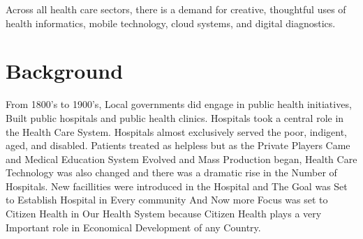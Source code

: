 \documentclass[12pt]{article}
\begin{document}
 Across all health care sectors, there is a demand for creative, thoughtful uses of health informatics, mobile technology, cloud systems, and digital diagnostics.
\section{Background}

From 1800's to 1900's, Local governments did engage in public health initiatives, Built public hospitals and public health clinics. Hospitals took a central role in the Health Care System. Hospitals almost exclusively served the poor, indigent, aged, and disabled. Patients treated as helpless but as the Private Players Came and Medical Education System Evolved and Mass Production began, Health Care Technology was also changed and there was a dramatic rise in the Number of Hospitals. New facillities were introduced in the Hospital and The Goal was Set to Establish Hospital in Every  community And Now more Focus was set to Citizen Health in Our Health System because Citizen Health plays a very Important role in Economical Development of any Country.\\
\end{document}
